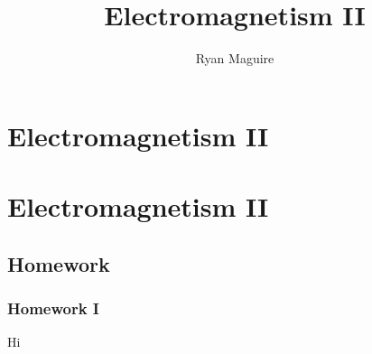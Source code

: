 \documentclass[crop=false,class=book,oneside]{standalone}
\begin{document}
\ifx\ifmain\undefined
    \title{Electromagnetism II}
    \author{Ryan Maguire}
    \date{\vspace{-5ex}}
    \maketitle
    \tableofcontents
    \chapter*{Electromagnetism II}
    \setcounter{chapter}{1}
\else
    \chapter{Electromagnetism II}
\fi
\section{Homework}
\subsection{Homework I}
Hi
\end{document}

